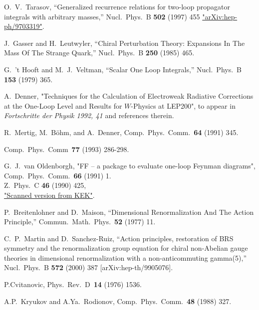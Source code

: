 \begin{thebibliography}{99}
O.~V.~Tarasov,
``Generalized recurrence relations for two-loop propagator integrals with  arbitrary masses,''
Nucl.\ Phys.\ B {\bf 502} (1997) 455
\href{http://xxx.lanl.gov/abs/hep-ph/9703319}{"arXiv:hep-ph/9703319"}.

J.~Gasser and H.~Leutwyler,
``Chiral Perturbation Theory: Expansions In The Mass Of The Strange Quark,''
Nucl.\ Phys.\ B {\bf 250} (1985) 465.

G.~'t Hooft and M.~J.~Veltman,
``Scalar One Loop Integrals,''
Nucl.\ Phys.\ B {\bf 153} (1979) 365.

A.~Denner,  "Techniques for the Calculation of Electroweak 
Radiative Corrections at the One-Loop Level and Results for 
$W$-Physics at LEP200", 
to appear in {\sl Fortschritte der Physik 1992, 41} 
and references therein.

 R.~Mertig, M.~B\"ohm, and A.~Denner,
Comp.~Phys.~Comm.~{\bf 64} (1991) 345. 

Comp.~Phys.~Comm~{\bf 77} (1993) 286-298.

G.~J.~van Oldenborgh, "FF -- a package to evaluate one-loop Feynman diagrams",
Comp.~Phys.~Comm.~{\bf 66} (1991) 1.\\
Z.\ Phys.\ C {\bf 46} (1990) 425,\\
\href{http://ccdb3fs.kek.jp/cgi-bin/img_index?9004168}{"Scanned version from KEK"}.

P.~Breitenlohner and D.~Maison,
``Dimensional Renormalization And The Action Principle,''
Commun.\ Math.\ Phys.\  {\bf 52} (1977) 11.

C.~P.~Martin and D.~Sanchez-Ruiz,
``Action principles, restoration of BRS symmetry and the renormalization  group equation for chiral non-Abelian gauge theories in dimensional
renormalization with a non-anticommuting gamma(5),''
Nucl.\ Phys.\ B {\bf 572} (2000) 387
[arXiv:hep-th/9905076].

P.Cvitanovic, Phys.~Rev.~D~{\bf 14} (1976) 1536.

A.P.~Kryukov and A.Ya.~Rodionov, Comp.~Phys.~Comm.~{\bf 48} (1988) 
327.


\end{thebibliography}
